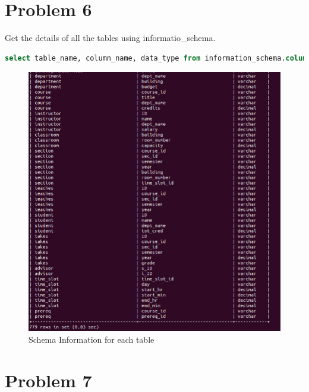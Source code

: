 \documentclass{article}
\begin{document}
\newpage
\section{Problem 6}
Get the details of all the tables using informatio\_schema.
\begin{lstlisting}[language=sql]
  select table_name, column_name, data_type from information_schema.columns;
\end{lstlisting}
\begin{figure}[!ht]
  \begin{center}
  \includegraphics[scale=0.7]{Q6.png}
  \caption{Schema Information for each table}
  \end{center}
\end{figure}

\newpage

\section{Problem 7}
\end{document}
